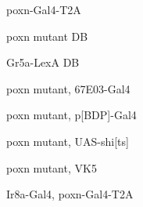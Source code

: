 \documentclass[17pt]{extarticle}
\begin{document}
\footnotesize
\vspace*{\fill}
\newpage{}
\vspace*{\fill}\begin{normalsize}
poxn-Gal4-T2A \\[0.5em]
\end{normalsize}
\footnotesize
\vspace*{\fill}
\newpage{}
\vspace*{\fill}\begin{normalsize}
poxn mutant DB \\[0.5em]
\end{normalsize}
\footnotesize
\vspace*{\fill}
\newpage{}
\vspace*{\fill}\begin{normalsize}
Gr5a-LexA DB \\[0.5em]
\end{normalsize}
\footnotesize
\vspace*{\fill}
\newpage{}
\vspace*{\fill}\begin{footnotesize}
poxn mutant, 67E03-Gal4 \\[0.5em]
\end{footnotesize}
\footnotesize
\vspace*{\fill}
\newpage{}
\vspace*{\fill}\begin{footnotesize}
poxn mutant, p[BDP]-Gal4 \\[0.5em]
\end{footnotesize}
\footnotesize
\vspace*{\fill}
\newpage{}
\vspace*{\fill}\begin{footnotesize}
poxn mutant, UAS-shi[ts] \\[0.5em]
\end{footnotesize}
\footnotesize
\vspace*{\fill}
\newpage{}
\vspace*{\fill}\begin{small}
poxn mutant, VK5 \\[0.5em]
\end{small}
\footnotesize
\vspace*{\fill}
\newpage{}
\vspace*{\fill}\begin{footnotesize}
Ir8a-Gal4, poxn-Gal4-T2A \\[0.5em]
\end{footnotesize}
\end{document}
